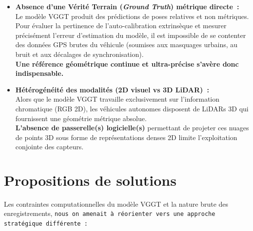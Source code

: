 \documentclass[12pt,a4paper,oneside]{report}
\begin{document}
\begin{itemize}
    \item {\bfseries Absence d'une Vérité Terrain (\textit{Ground Truth}) métrique directe~:  \vspace{0.3cm}}\\
    \hspace*{1em}Le modèle VGGT produit des prédictions de poses relatives et non métriques. \\
    \hspace*{.8cm}Pour évaluer la pertinence de l'auto-calibration extrinsèque et mesurer précisément l'erreur d'estimation du modèle, il est impossible de se contenter des données GPS brutes du véhicule (soumises aux masquages urbains, au bruit et aux décalages de synchronisation).\\
    \hspace*{1em}\textbf{Une référence géométrique continue et ultra-précise s'avère donc indispensable.}
    
    \item {\bfseries Hétérogénéité des modalités (2D visuel vs 3D LiDAR)~:  \vspace{0.3cm}} \\
    \hspace*{1em}Alors que le modèle VGGT travaille exclusivement sur l'information chromatique (RGB 2D), les véhicules autonomes disposent de LiDARs 3D qui fournissent une géométrie métrique absolue. \\
    \hspace*{1em}\textbf{L'absence de passerelle(s) logicielle(s) }permettant de projeter ces nuages de points 3D sous forme de représentations denses 2D limite l'exploitation conjointe des capteurs.

\end{itemize}

\newpage

\section{Propositions de solutions}
\label{subsec:solutions_pipeline}


\setlength{\parskip}{0.7em}
\setlength{\parindent}{0pt}
\linespread{1.08}\selectfont

\paragraph{}
Les contraintes computationnelles du modèle VGGT et la nature brute des enregistrements, \texttt{nous on amenait à réorienter vers une approche stratégique différente~:}
\end{document}
